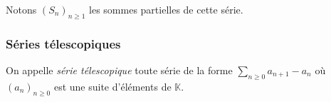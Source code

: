 \documentclass[french,11pt,twoside]{VcCours}
\newcommand{\dx}{\text{d}x}
\newcommand{\Sum}[2]{\ensuremath{\textstyle{\sum\limits_{#1}^{#2}}}}
\newcommand{\Int}[2]{\ensuremath{\mathchoice%
	{{\displaystyle\int_{#1}^{#2}}}
	{{\displaystyle\int_{#1}^{#2}}}
	{\int_{#1}^{#2}}
	{\int_{#1}^{#2}}
}}
\begin{document}
Notons $(S_n)_{n \geq 1}$ les sommes partielles de cette série.

\newpage

\subsubsection{Séries télescopiques}

On appelle \textit{série télescopique} toute série de la forme $\Sum{n\geq 0}{} a_{n+1}-a_n$ où $(a_n)_{n \geq 0}$ est une suite d'éléments de $\mathbb{K}$.
\end{document}
